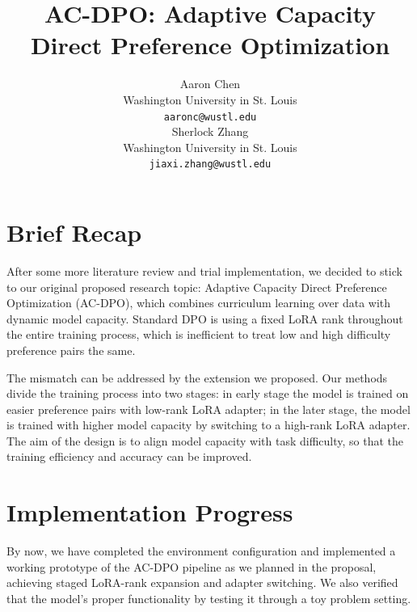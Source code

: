 \documentclass{article}
\title{AC-DPO: Adaptive Capacity Direct Preference Optimization}
\author{
  Aaron Chen \\
  Washington University in St. Louis \\
  \texttt{aaronc@wustl.edu} \\
  \And
  Sherlock Zhang \\
  Washington University in St. Louis \\
  \texttt{jiaxi.zhang@wustl.edu} \\
}
\begin{document}
\maketitle



\vspace{-2.5em}
\section{Brief Recap}
After some more literature review and trial implementation, we decided to stick to our original proposed research topic: Adaptive Capacity Direct Preference Optimization (AC-DPO), which combines curriculum learning over data with dynamic model capacity. Standard DPO is using a fixed LoRA rank throughout the entire training process, which is inefficient to treat low and high difficulty preference pairs the same.

The mismatch can be addressed by the extension we proposed. Our methods divide the training process into two stages: in early stage the model is trained on easier preference pairs with low-rank LoRA adapter; in the later stage, the model is trained with higher model capacity by switching to a high-rank LoRA adapter. The aim of the design is to align model capacity with task difficulty, so that the training efficiency and accuracy can be improved.

\section{Implementation Progress}
By now, we have completed the environment configuration and implemented a working prototype of the AC-DPO pipeline as we planned in the proposal, achieving staged LoRA-rank expansion and adapter switching. We also verified that the model's proper functionality by testing it through a toy problem setting.
\end{document}

